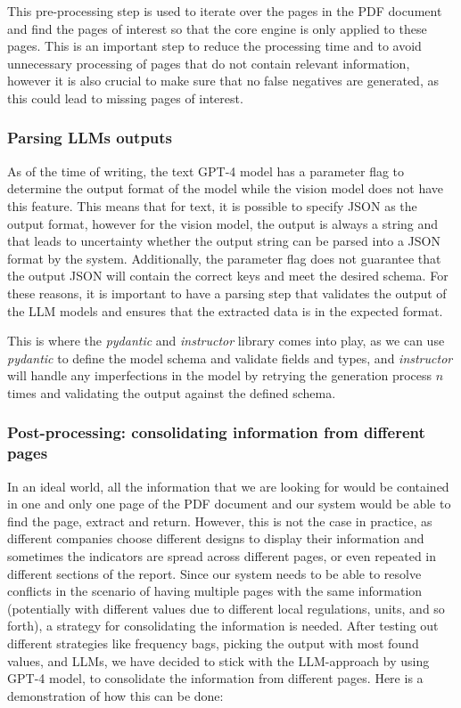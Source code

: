 \documentclass[english, 12pt, a4paper, elec, utf8, a-2b, online]{aaltothesis}
\begin{document}
This pre-processing step is used to iterate over the pages in the \ac{PDF} document and find the pages of interest so that the core engine is only applied to these pages.
This is an important step to reduce the processing time and to avoid unnecessary processing of pages that do not contain relevant information, however it is also crucial to make sure that no false negatives are generated, as this could lead to missing pages of interest.

\subsubsection{Parsing LLMs outputs}

As of the time of writing, the text \ac{GPT}-4 model has a parameter flag to determine the output format of the model while the vision model does not have this feature.
This means that for text, it is possible to specify \ac{JSON} as the output format, however for the vision model, the output is always a string and that leads to uncertainty whether the output string can be parsed into a \ac{JSON} format by the system.
Additionally, the parameter flag does not guarantee that the output \ac{JSON} will contain the correct keys and meet the desired schema.
For these reasons, it is important to have a parsing step that validates the output of the \ac{LLM} models and ensures that the extracted data is in the expected format.

This is where the \textit{pydantic} and \textit{instructor} library comes into play, as we can use \textit{pydantic} to define the model schema and validate fields and types, and \textit{instructor} will handle any imperfections in the model by retrying the generation process $n$ times and validating the output against the defined schema.



\subsubsection{Post-processing: consolidating information from different pages}

In an ideal world, all the information that we are looking for would be contained in one and only one page of the \ac{PDF} document and our system would be able to find the page, extract and return.
However, this is not the case in practice, as different companies choose different designs to display their information and sometimes the indicators are spread across different pages, or even repeated in different sections of the report.
Since our system needs to be able to resolve conflicts in the scenario of having multiple pages with the same information (potentially with different values due to different local regulations, units, and so forth), a strategy for consolidating the information is needed.
After testing out different strategies like frequency bags, picking the output with most found values, and \ac{LLM}s, we have decided to stick with the \ac{LLM}-approach by using \ac{GPT}-4 model, to consolidate the information from different pages.
Here is a demonstration of how this can be done:
\end{document}
